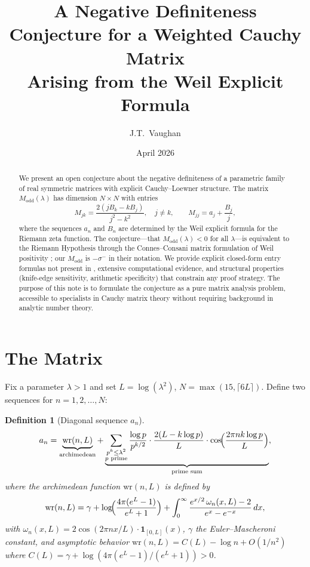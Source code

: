 \documentclass[11pt,a4paper]{article}
\title{A Negative Definiteness Conjecture for a Weighted Cauchy Matrix\\
Arising from the Weil Explicit Formula}
\author{J.T.\ Vaughan}
\date{April 2026}
\newtheorem{definition}{Definition}
\begin{document}
\maketitle

\begin{abstract}
We present an open conjecture about the negative definiteness of a parametric family of real symmetric matrices with explicit Cauchy--Loewner structure. The matrix $M_{\mathrm{odd}}(\lambda)$ has dimension $N \times N$ with entries
\[
M_{jk} = \frac{2(jB_k - kB_j)}{j^2 - k^2}, \quad j \neq k, \qquad M_{jj} = a_j + \frac{B_j}{j},
\]
where the sequences $a_n$ and $B_n$ are determined by the Weil explicit formula for the Riemann zeta function. The conjecture---that $M_{\mathrm{odd}}(\lambda) < 0$ for all $\lambda$---is equivalent to the Riemann Hypothesis through the Connes--Consani matrix formulation of Weil positivity \cite{CC2020}; our $M_{\mathrm{odd}}$ is $-\sigma^-$ in their notation. We provide explicit closed-form entry formulas not present in \cite{CC2020}, extensive computational evidence, and structural properties (knife-edge sensitivity, arithmetic specificity) that constrain any proof strategy. The purpose of this note is to formulate the conjecture as a pure matrix analysis problem, accessible to specialists in Cauchy matrix theory without requiring background in analytic number theory.
\end{abstract}

\section{The Matrix}

Fix a parameter $\lambda > 1$ and set $L = \log(\lambda^2)$, $N = \max(15, \lceil 6L \rceil)$. Define two sequences for $n = 1, 2, \ldots, N$:

\begin{definition}[Diagonal sequence $a_n$]\label{def:an}
\begin{equation}\label{eq:an}
a_n = \underbrace{\mathrm{wr}(n, L)}_{\text{archimedean}} + \underbrace{\sum_{\substack{p^k \leq \lambda^2 \\ p \text{ prime}}} \frac{\log p}{p^{k/2}} \cdot \frac{2(L - k\log p)}{L} \cdot \cos\!\Bigl(\frac{2\pi n k \log p}{L}\Bigr)}_{\text{prime sum}},
\end{equation}
where the archimedean function $\mathrm{wr}(n, L)$ is defined by
\begin{equation}\label{eq:wr}
\mathrm{wr}(n, L) = \gamma + \log\!\Bigl(\frac{4\pi(e^L - 1)}{e^L + 1}\Bigr) + \int_0^\infty \frac{e^{x/2}\,\omega_n(x,L) - 2}{e^x - e^{-x}}\,dx,
\end{equation}
with $\omega_n(x, L) = 2\cos(2\pi n x/L)\cdot\mathbf{1}_{[0,L]}(x)$, $\gamma$ the Euler--Mascheroni constant, and asymptotic behavior $\mathrm{wr}(n,L) = C(L) - \log n + O(1/n^2)$ where $C(L) = \gamma + \log(4\pi(e^L-1)/(e^L+1)) > 0$.
\end{definition}
\end{document}
